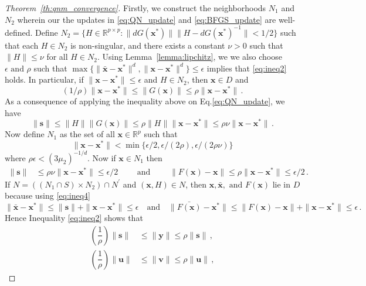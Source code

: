 \documentclass{statsoc}
\newcommand{\bs}{\boldsymbol{s}}
\newcommand{\bu}{\boldsymbol{u}}
\newcommand{\bv}{\boldsymbol{v}}
\newcommand{\bx}{\boldsymbol{x}}
\newcommand{\by}{\boldsymbol{y}}
\begin{document}
\begin{proof}[Theorem~\ref{th:qnm_convergence}]
Firstly, we construct the neighborhoods $N_1$ and $N_2$ wherein our the updates in \eqref{eq:QN_update} and \eqref{eq:BFGS_update} are well-defined. Define $N_2 = \{H \in \mathbb{R}^{p\times p}: \|dG(\bx^\ast)\|\|H - dG(\bx^\ast)^{-1}\| < 1/2\}$ such that each $H \in N_2$ is non-singular, and there exists a constant $\nu > 0$ such that $\|H\| \leq \nu$ for all $H \in N_2$. Using Lemma~\ref{lemma:lipchitz}, we we also choose $\epsilon \text{ and } \rho$ such that $\max\{\|\bar{\bx} - \bx^\ast\|^d, \|\bx-\bx^\ast\|^d\} \leq \epsilon$ implies that \eqref{eq:ineq2} holds. In particular, if $\|\bx - \bx^\ast\| \leq \epsilon$ and $H \in N_2$, then $\bx \in D$ and 
\[
(1/\rho)\|\bx - \bx^\ast\| \leq \|G(\bx)\| \leq \rho \|\bx - \bx^\ast\|\,.
\]
As a consequence of applying the inequality above on Eq.\eqref{eq:QN_update}, we have
\[
\|\bs\| \leq \|H\|\|G(\bx)\| \leq \rho \|H\| \|\bx - \bx^\ast\| \leq \rho \nu \|\bx- \bx^\ast\|\,.
\]
Now define $N_1$ as the set of all $\bx\in \mathbb{R}^p$ such that 
\[
\|\bx - \bx^\ast\| < \min\{\epsilon/2, \epsilon/(2\rho), \epsilon/(2\rho \nu)\}
\]
where $\rho \epsilon < (3\mu_2)^{-1/d}$. Now if $\bx \in N_1$ then
\begin{align} \label{eq:ineq4}
    \|\bs\| &\leq \rho \nu \|\bx-\bx^\ast\| \leq \epsilon/2 \qquad \text{ and } \qquad
    \|F(\bx) - \bx\| \leq \rho \|\bx - \bx^\ast\| \leq \epsilon/2\,.
\end{align}
If $N = ((N_1 \cap S) \times N_2) \cap N^\prime$ and $(\bx, H) \in N$, then $\bx, \bar{\bx}, \text{ and } F(\bx)$ lie in $D$ because using \eqref{eq:ineq4}
\[
\|\bar{\bx} - \bx^\ast\| \leq \|\bs\| + \|\bx - \bx^\ast\| \leq \epsilon \quad \text{and} \quad \|\bar{F(\bx)} - \bx^\ast\| \leq \|F(\bx) - \bx\| + \|\bx - \bx^\ast\| \leq \epsilon\,.
\]
Hence Inequality \eqref{eq:ineq2} shows that
\begin{subequations} 
\begin{align}
    \left(\dfrac{1}{\rho}\right)\|\bs\| &\leq \|\by\| \leq \rho \|\bs\|\,,\\
    \left(\dfrac{1}{\rho}\right)\|\bu\| &\leq \|\bv\| \leq \rho \|\bu\|\,, \label{eq:uv_ineq}
\end{align}
\end{subequations}


\end{proof}
\end{document}
